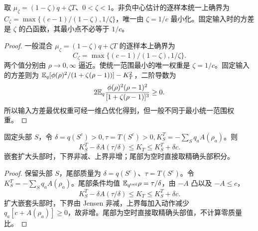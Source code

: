 \begin{proposition}[混合提案的统一范围与输入方差]
取 $\mu_\zeta=(1-\zeta)q+\zeta T$、$0<\zeta<1$。非负中心估计的逐样本统一上确界为
$C_\zeta=\max\{(c-1)/(1-\zeta),1/\zeta\}$，唯一由 $\zeta=1/c$ 最小化。固定输入时的方差是 $\zeta$ 的凸函数，其最小点不必等于 $1/c$。
\end{proposition}
\begin{proof}
一般混合 $\mu_\zeta=(1-\zeta)q+\zeta T$ 的逐样本上确界为
\begin{equation}
C_\zeta=\max\{(c-1)/(1-\zeta),1/\zeta\}.
\end{equation}
两个值分别由 $\rho\to0,\infty$ 逼近。使统一范围最小的唯一权重是 $\zeta=1/c$。固定输入的方差则为 $\mathbb E_q[\phi(\rho)^2/(1+\zeta(\rho-1))]-K_T^2$，二阶导数为
\begin{equation}
2\mathbb E_q\frac{\phi(\rho)^2(\rho-1)^2}{[1+\zeta(\rho-1)]^3}\ge0.
\end{equation}
所以输入方差最优权重可经一维凸优化得到，但一般不同于最小统一范围权重。
\end{proof}

\begin{proposition}[头尾质量给出的中心区间]
固定头部 $S$，令 $\delta=q(S^c)>0,\tau=T(S^c)>0,K_S^T=-\sum_Sq_aA(\rho_a)$。则
\begin{equation}
K_S^T-\delta A(\tau/\delta)\le K_T\le K_S^T+\delta c.
\end{equation}
嵌套扩大头部时，下界非减、上界非增；尾部为空时直接取精确头部积分。
\end{proposition}
\begin{proof}
保留头部 $S$，尾部质量为 $\delta=q(S^c)$、$\tau=T(S^c)$。令 $K_S^T=-\sum_Sq_aA(\rho_a)$。尾部条件均值 $\mathbb E_{q^{\rm tail}}\rho=\tau/\delta$，由 $-A$ 凸以及 $-A\le c$，
\begin{equation}
K_S^T-\delta A(\tau/\delta)\le K_T\le K_S^T+\delta c.
\label{eq:center-interval}
\end{equation}
扩大嵌套头部时，下界由 Jensen 非减，上界每加入动作减少 $q_a[c+A(\rho_a)]\ge0$，故非增。尾部为空时直接取精确头部值，不计算零质量比。
\end{proof}

